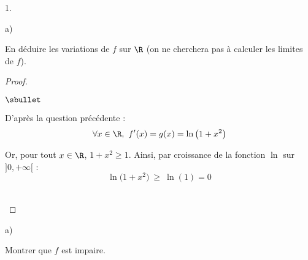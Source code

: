 \begin{noliste}{1.}
\begin{noliste}{a)}
  \item En déduire les variations de $f$ sur $\R$ (on ne cherchera pas
    à calculer les limites de $f$).

    \begin{proof}~%
      \begin{noliste}{$\sbullet$}
      \item D'après la question précédente :
        \[
        \forall x \in \R, \ f'(x) = g(x) = \ln\big( 1 + x^2 \big)
        \]

      \item Or, pour tout $x \in \R$, $1 + x^2 \geq 1$. Ainsi, par
        croissance de la fonction $\ln$ sur $]0, +\infty[$ :
        \[
        \ln\big( 1 + x^2 \big) \ \geq \ \ln(1) = 0
        \]        
      \end{noliste}
      ~\\[-1.2cm]
    \end{proof}
  \end{noliste}


\newpage


\item 
  \begin{noliste}{a)}
    \setlength{\itemsep}{2mm}
  \item Montrer que $f$ est impaire.


\end{noliste}
\end{noliste}

